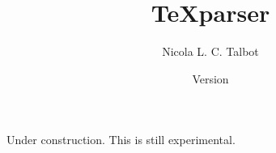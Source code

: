 \documentclass{report}
\title{\TeX parser}
\author{Nicola L. C. Talbot}
\date{Version \theversion}
\begin{document}
\maketitle

Under construction. This is still experimental.
\end{document}
